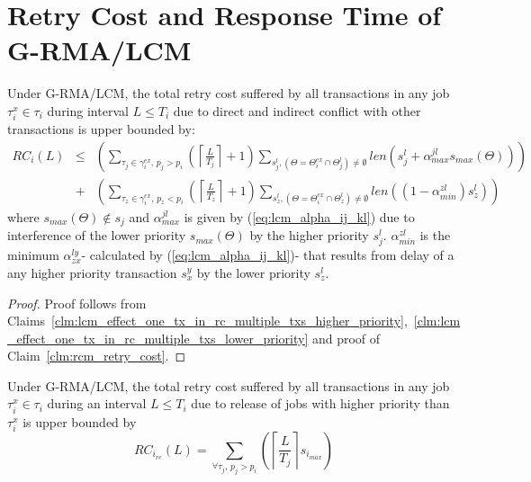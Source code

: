 \section{Retry Cost and Response Time of G-RMA/LCM}\label{rma}
%
\begin{clm}\label{response g-rma/lcm}
%
Under G-RMA/LCM, the total retry cost suffered by all transactions in any job $\tau_i^x \in \tau_i$ during interval $L \le T_{i}$ due to direct and indirect conflict with other transactions is upper bounded by:
%
\begin{eqnarray}
RC_i\left(L\right) & \le & \left(\sum_{\tau_j \in \gamma_i^{ex},\,p_j > p_i}\left(\left\lceil\frac{L}{T_{j}}\right\rceil+1\right)\sum_{s_j^l,\left(\Theta=\Theta_i^{ex} \cap \Theta_j^l \right)\neq \emptyset}len\left(s_j^l+\alpha_{max}^{jl}s_{max}\left(\Theta\right)\right)\right)
\nonumber\\
& + & 
\left(\sum_{\tau_z \in \gamma_i^{ex},\,p_z < p_i}\left(\left\lceil\frac{L}{T_{z}}\right\rceil+1\right)\sum_{s_z^l,\left(\Theta=\Theta_i^{ex} \cap \Theta_z^l \right)\neq \emptyset}len\left(\left(1-\alpha_{min}^{zl}\right)s_z^l\right)\right)
\label{eq60}
\end{eqnarray} 
%
where $s_{max}\left(\Theta\right) \not\in s_j$ and $\alpha_{max}^{jl}$ is given by (\ref{eq:lcm_alpha_ij_kl}) due to interference of the lower priority $s_{max}\left(\Theta\right)$ by the higher priority $s_j^l$. $\alpha_{min}^{zl}$ is the minimum $\alpha_{zx}^{ly}$- calculated by (\ref{eq:lcm_alpha_ij_kl})- that results from delay of a any higher priority transaction $s_x^y$ by the lower priority $s_z^l$.
%
\end{clm}
%
\begin{proof}\normalfont
%
Proof follows from Claims~\ref{clm:lcm_effect_one_tx_in_rc_multiple_txs_higher_priority},~\ref{clm:lcm_effect_one_tx_in_rc_multiple_txs_lower_priority} and proof of Claim~\ref{clm:rcm_retry_cost}.
%
\end{proof}
%
\begin{clm}\label{clm:grma_lcm_release_conflict}
%
Under G-RMA/LCM, the total retry cost suffered by all transactions in any job $\tau_i^x \in \tau_i$ during an interval $L \le T_i$ due to release of jobs with higher priority than $\tau_i^x$ is upper bounded by 
\begin{equation}
RC_{i_{re}}(L)=\sum_{\forall \tau_j,\,p_j > p_i}\left(\left\lceil\frac{L}{T_j}\right\rceil s_{i_{max}}\right)
\label{eq:grma_lcm_release_conflict}
\end{equation}
%
\end{clm}
